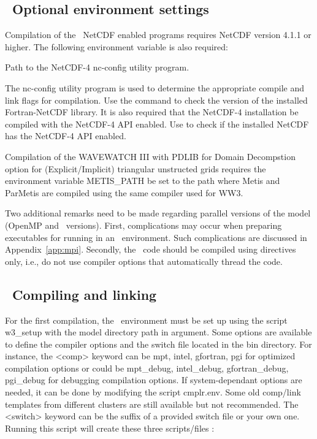 \vssub
\subsection{~Optional environment settings}
\vssub

Compilation of the \ws\ NetCDF enabled programs requires NetCDF version 4.1.1 or higher.
The following environment variable is also required:  
\begin{clist}
 {Path to the NetCDF-4 nc-config utility program.}
\end{clist}
The {\file nc-config} utility program is used to determine the appropriate
compile and link flags for compilation.
Use the command
 to check the version of the installed 
Fortran-NetCDF library.  It is also required that the NetCDF-4 installation 
be compiled with the
NetCDF-4 API enabled.  Use  to check if the
installed NetCDF has the NetCDF-4 API enabled.

\vspace{\baselineskip} 
\noindent
Compilation of the WAVEWATCH III with PDLIB for Domain Decompstion option
for (Explicit/Implicit) triangular unstructed grids requires the environment
variable {\code METIS\_PATH} be set to the path where {\code Metis} and
{\code ParMetis} are compiled using the same compiler used for WW3.

\vspace{\baselineskip}
\noindent
Two additional remarks need to be made regarding parallel versions of the
model (OpenMP and \mpi\ versions). First, complications may occur when
preparing executables for running in an \mpi\ environment. Such complications
are discussed in Appendix~\ref{app:mpi}. Secondly, the \omp\ code should be
compiled using directives only, i.e., do not use compiler options that
automatically thread the code.



\vssub
\subsection{~Compiling and linking} \label{sec:comp}
\vssub

\vspace{\baselineskip} \noindent 
For the first compilation, the \ws\ environment must be set up using the script
{\file w3\_setup} with the model directory path in argument. Some options are
available to define the compiler options and the switch file located in the
{\dir bin} directory. For instance,  the {\code <comp>} keyword can be {\code mpt}, 
{\code intel}, {\code gfortran}, {\code pgi} for optimized compilation options
or could be {\code mpt\_debug}, {\code intel\_debug}, {\code gfortran\_debug},
{\code pgi\_debug} for debugging compilation options. If system-dependant
options are needed, it can be done by modifying the script {\file cmplr.env}. 
Some old comp/link templates from different clusters are still available but 
not recommended. The {\code <switch>} keyword can be the suffix of a provided
switch file or your own one. Running this script will create these three 
scripts/files :

